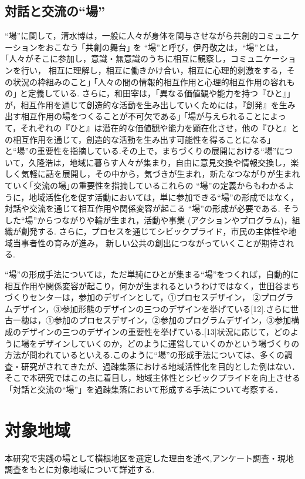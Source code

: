 \documentclass[a4paper]{jsarticle}
\begin{document}
\subsection{対話と交流の“場”}
“場”に関して，清水博は，一般に人々が身体を関与させながら共創的コミュニケーションをおこなう ｢共創の舞台｣ を “場”と呼び\cite{9}，伊丹敬之は，“場”とは，｢人々がそこに参加し，意識・無意識のうちに相互に観察し，コミュニケーションを行い， 相互に理解し，相互に働きかけ合い，相互に心理的刺激をする，その状況の枠組みのこと｣ ｢人々の間の情報的相互作用と心理的相互作用の容れもの｣ と定義している\cite{10}. さらに，和田宰は，｢異なる価値観や能力を持つ『ひと』｣ が，相互作用を通じて創造的な活動を生み出していくためには，『創発』を生み出す相互作用の場をつくることが不可欠である｣ ｢場が与えられることによって，それぞれの『ひと』は潜在的な価値観や能力を顕在化させ，他の『ひと』との相互作用を通じて，創造的な活動を生み出す可能性を得ることになる｣ と“場”の重要性を指摘している\cite{11}.その上で，まちづくりの展開における“場”について，久隆浩は，地域に暮らす人々が集まり，自由に意見交換や情報交換し，楽しく気軽に話を展開し，その中から，気づきが生まれ，新たなつながりが生まれていく｢交流の場｣の重要性を指摘している\cite{12}これらの “場”の定義からもわかるように，地域活性化を促す活動においては，単に参加できる“場”の形成ではなく，対話や交流を通じて相互作用や関係変容が起こる “場”の形成が必要である. そうした“場”からつながりや輪が生まれ，活動や事業 (アクションやプログラム)，組織が創発する. さらに，プロセスを通じてシビックプライド，市民の主体性や地域当事者性の育みが進み， 新しい公共の創出につながっていくことが期待される.\par
“場”の形成手法については，ただ単純にひとが集まる“場”をつくれば，自動的に相互作用や関係変容が起こり，何かが生まれるというわけではなく，世田谷まちづくりセンターは，参加のデザインとして，①プロセスデザイン， ②プログラムデザイン，③参加形態のデザインの三つのデザインを挙げている[12].さらに世古一穂は，①参加のプロセスデザイン，②参加のプログラムデザイン，③参加構成のデザインの三つのデザインの重要性を挙げている.[13]状況に応じて，どのように場をデザインしていくのか，どのように運営していくのかという場づくりの方法が問われているといえる.このように“場”の形成手法については、多くの調査・研究がされてきたが、過疎集落における地域活性化を目的とした例はない．そこで本研究ではこの点に着目し，地域主体性とシビックプライドを向上させる「対話と交流の“場”」を過疎集落において形成する手法について考察する．





\newpage
\section{対象地域}
本研究で実践の場として横根地区を選定した理由を述べ,アンケート調査・現地調査をもとに対象地域について詳述する.
\end{document}
